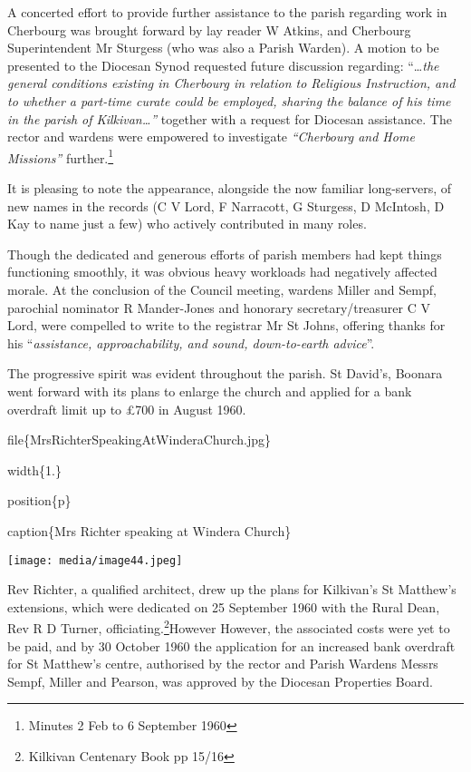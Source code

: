A concerted effort to provide further assistance to the parish regarding work in Cherbourg was brought forward by lay reader W Atkins, and Cherbourg Superintendent Mr Sturgess (who was also a Parish Warden). A motion to be presented to the Diocesan Synod requested future discussion regarding: ``\ldots{}\emph{the general conditions existing in Cherbourg in relation to Religious Instruction, and to whether a part-time curate could be employed, sharing the balance of his time in the parish of Kilkivan\ldots''} together with a request for Diocesan assistance. The rector and wardens were empowered to investigate \emph{``Cherbourg and Home Missions''} further.\footnote{Minutes 2 Feb to 6 September 1960}

It is pleasing to note the appearance, alongside the now familiar long-servers, of new names in the records (C V Lord, F Narracott, G Sturgess, D McIntosh, D Kay to name just a few) who actively contributed in many roles.

Though the dedicated and generous efforts of parish members had kept things functioning smoothly, it was obvious heavy workloads had negatively affected morale. At the conclusion of the Council meeting, wardens Miller and Sempf, parochial nominator R Mander-Jones and honorary secretary/treasurer C V Lord, were compelled to write to the registrar Mr St Johns, offering thanks for his ``\emph{assistance, approachability, and sound, down-to-earth advice}''.

The progressive spirit was evident throughout the parish. St David's, Boonara went forward with its plans to enlarge the church and applied for a bank overdraft limit up to £700 in August 1960.

file\{MrsRichterSpeakingAtWinderaChurch.jpg\}

width\{1.\}

position\{p\}

caption\{Mrs Richter speaking at Windera Church\}

\texttt{[image: media/image44.jpeg]}

Rev Richter, a qualified architect, drew up the plans for Kilkivan's St Matthew's extensions, which were dedicated on 25 September 1960 with the Rural Dean, Rev R D Turner, officiating.\footnote{Kilkivan Centenary Book pp 15/16}However However, the associated costs were yet to be paid, and by 30 October 1960 the application for an increased bank overdraft for St Matthew's centre, authorised by the rector and Parish Wardens Messrs Sempf, Miller and Pearson, was approved by the Diocesan Properties Board.


